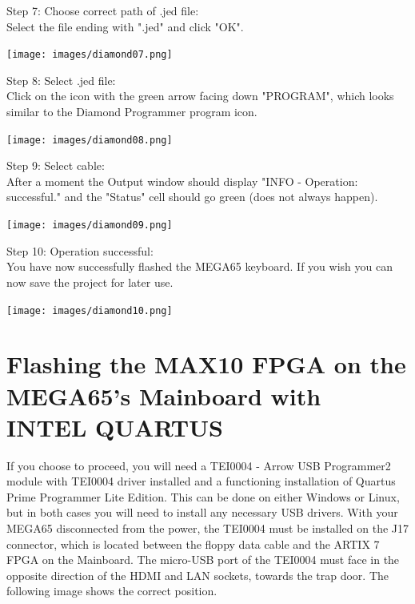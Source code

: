 \begin{minipage}{\linewidth}
Step 7: Choose correct path of .jed file: \\
Select the file ending with ".jed" and click "OK".
  \begin{center}
  \texttt{[image: images/diamond07.png]}
  \end{center}
\end{minipage}

\vspace{5mm}

\begin{minipage}{\linewidth}
  Step 8: Select .jed file: \\
Click on the icon with the green arrow facing down "PROGRAM",
which looks similar to the Diamond Programmer program icon.
  \begin{center}
  \texttt{[image: images/diamond08.png]}
  \end{center}
\end{minipage}


\begin{minipage}{\linewidth}
Step 9: Select cable: \\
After a moment the Output window should display
"INFO - Operation: successful." and the "Status" cell should
go green (does not always happen).
  \begin{center}
  \texttt{[image: images/diamond09.png]}
  \end{center}
\end{minipage}

\vspace{5mm}

\begin{minipage}{\linewidth}
Step 10: Operation successful: \\
You have now successfully flashed the MEGA65 keyboard.
If you wish you can now save the project for later use.
  \begin{center}
  \texttt{[image: images/diamond10.png]}
  \end{center}
\end{minipage}


\section{Flashing the MAX10 FPGA on the MEGA65's Mainboard with INTEL QUARTUS}

If you choose to proceed, you will need a TEI0004 - Arrow USB Programmer2 module with TEI0004 driver installed
and a functioning installation of Quartus Prime Programmer Lite Edition.  This can be done on either Windows
or Linux, but in both cases you will need to install any necessary USB drivers.
With your MEGA65 disconnected from the power, the TEI0004 must be installed on the J17 connector,
which is located between the floppy data cable and the ARTIX 7 FPGA on the Mainboard.
The micro-USB port of the TEI0004 must face in the opposite direction of the HDMI and LAN sockets, towards
the trap door.
The following image shows the correct position.

